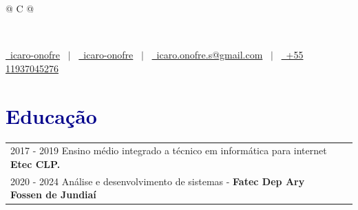 \documentclass[a4paper,o12pt]{article}
\begin{document}
\pagestyle{empty} 



\begin{tabularx}{\linewidth}{@{} C @{}}
\begin{flushleft}
	\fontsize{30}{60} \\[10pt]
\end{flushleft}
\color{black}
\href{https://github.com/icaro-onofre}{\raisebox{-0.05\height}\faGithub\ icaro-onofre} \ $|$ \ 
\href{https://linkedin.com/in/icaro-onofre}{\raisebox{-0.05\height}\faLinkedin\ icaro-onofre} \ $|$ \ 
\href{mailto:icaro.onofre.s@gmail.com}{\raisebox{-0.05\height}\faEnvelope \ icaro.onofre.s@gmail.com} \ $|$ \ 
\href{tel:+11937045276}{\raisebox{-0.05\height}\faMobile \ +55 11937045276} \\
\end{tabularx}
\section{{\textcolor{darkblue}{\textbf{Educação}}}}
\begin{tabularx}{\linewidth}{@{}l X@{}}	

	2017 - 2019 Ensino médio integrado a técnico em informática para internet \textbf{Etec CLP.} \\

2020 - 2024 Análise e desenvolvimento de sistemas - \textbf{Fatec Dep Ary Fossen de Jundiaí} \\

\end{tabularx}
\end{document}
